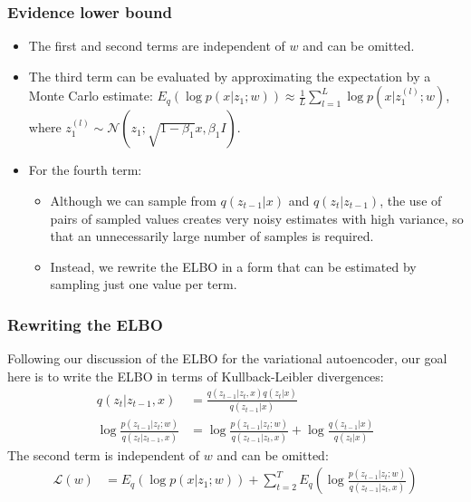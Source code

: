 \documentclass{beamer}
\begin{document}
\begin{frame}
    \frametitle{Evidence lower bound}
    \begin{itemize}
        \item The first and second terms are independent of $w$ and can be omitted.
        \item The third term can be evaluated by approximating the expectation by a Monte Carlo estimate: $E_{q}(\log{}p(x|z_{1};w))\approx\frac{1}{L}\sum_{l=1}^{L}\log{}p(x|z_{1}^{(l)};w)$, where $z_{1}^{(l)}\sim\mathcal{N}(z_{1};\sqrt{1-\beta_{1}}x,\beta_{1}I)$.
        \item For the fourth term:
        \begin{itemize}
            \item Although we can sample from $q(z_{t-1}|x)$ and $q(z_{t}|z_{t-1})$, the use of pairs of sampled values creates very noisy estimates with high variance, so that an unnecessarily large number of samples is required.
            \item Instead, we rewrite the ELBO in a form that can be estimated by sampling just one value per term.
        \end{itemize}
    \end{itemize}
\end{frame}

\begin{frame}
    \frametitle{Rewriting the ELBO}
    Following our discussion of the ELBO for the variational autoencoder, our goal here is to write the ELBO in terms of Kullback-Leibler divergences:
    \begin{align*}
        q(z_{t}|z_{t-1},x)&=\frac{q(z_{t-1}|z_{t},x)q(z_{t}|x)}{q(z_{t-1}|x)} \\
        \log\frac{p(z_{t-1}|z_{t};w)}{q(z_{t}|z_{t-1},x)}&=\log\frac{p(z_{t-1}|z_{t};w)}{q(z_{t-1}|z_{t},x)}+\log\frac{q(z_{t-1}|x)}{q(z_{t}|x)}
    \end{align*}
    The second term is independent of $w$ and can be omitted:
    \begin{align*}
        \mathcal{L}(w)&=E_{q}(\log{}p(x|z_{1};w))+\sum_{t=2}^{T}E_{q}(\log\frac{p(z_{t-1}|z_{t};w)}{q(z_{t-1}|z_{t},x)})
    \end{align*}
\end{frame}
\end{document}
